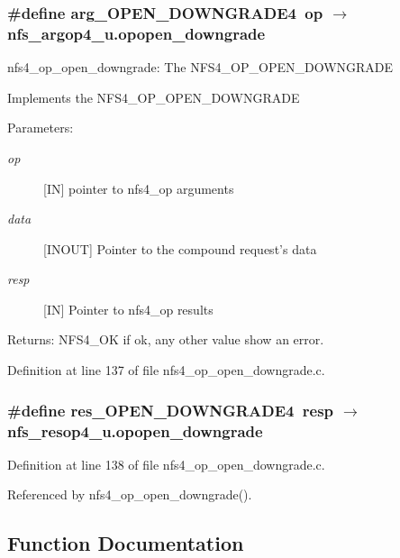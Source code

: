 \subsubsection{\setlength{\rightskip}{0pt plus 5cm}\#define arg\_\-OPEN\_\-DOWNGRADE4\ op $\rightarrow$ nfs\_\-argop4\_\-u.opopen\_\-downgrade}\label{nfs4__op__open__downgrade_8c_a0}


nfs4\_\-op\_\-open\_\-downgrade: The NFS4\_\-OP\_\-OPEN\_\-DOWNGRADE

Implements the NFS4\_\-OP\_\-OPEN\_\-DOWNGRADE

\begin{Desc}
\item[Parameters:]
\begin{description}
\item[{\em op}][IN] pointer to nfs4\_\-op arguments \item[{\em data}][INOUT] Pointer to the compound request's data \item[{\em resp}][IN] Pointer to nfs4\_\-op results\end{description}
\end{Desc}
\begin{Desc}
\item[Returns:]NFS4\_\-OK if ok, any other value show an error. \end{Desc}


Definition at line 137 of file nfs4\_\-op\_\-open\_\-downgrade.c.
\subsubsection{\setlength{\rightskip}{0pt plus 5cm}\#define res\_\-OPEN\_\-DOWNGRADE4\ resp $\rightarrow$ nfs\_\-resop4\_\-u.opopen\_\-downgrade}\label{nfs4__op__open__downgrade_8c_a1}




Definition at line 138 of file nfs4\_\-op\_\-open\_\-downgrade.c.

Referenced by nfs4\_\-op\_\-open\_\-downgrade().

\subsection{Function Documentation}
